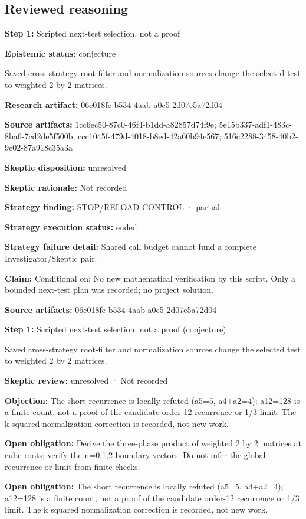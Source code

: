 \documentclass[11pt]{article}
\begin{document}
\subsection{Reviewed reasoning}
\textbf{Step 1:} Scripted next-test selection, not a proof\par
\textbf{Epistemic status:} conjecture\par
Saved cross-strategy root-filter and normalization sources change the selected test to weighted 2 by 2 matrices.\par
\textbf{Research artifact:} 06e018fe-b534-4aab-a0c5-2d07e5a72d04\par
\textbf{Source artifacts:} 1cc6ec50-87c0-46f4-b1dd-a82857d74f9e; 5e15b337-adf1-483c-8ba6-7cd2de5f500b; ccc1045f-479d-4018-b8ed-42a60b94e567; 516c2288-3458-40b2-9e02-87a918c35a3a\par
\textbf{Skeptic disposition:} unresolved\par
\textbf{Skeptic rationale:} Not recorded\par
\textbf{Strategy finding:} STOP/RELOAD CONTROL · partial\par
\textbf{Strategy execution status:} ended\par
\textbf{Strategy failure detail:} Shared call budget cannot fund a complete Investigator/Skeptic pair.\par
\textbf{Claim:} Conditional on: No new mathematical verification by this script. Only a bounded next-test plan was recorded; no project solution.\par
\textbf{Source artifacts:} 06e018fe-b534-4aab-a0c5-2d07e5a72d04\par
\textbf{Step 1:} Scripted next-test selection, not a proof (conjecture)\par
Saved cross-strategy root-filter and normalization sources change the selected test to weighted 2 by 2 matrices.\par
\textbf{Skeptic review:} unresolved · Not recorded\par
\textbf{Objection:} The short recurrence is locally refuted (a5=5, a4+a2=4); a12=128 is a finite count, not a proof of the candidate order-12 recurrence or 1/3 limit. The k squared normalization correction is recorded, not new work.\par
\textbf{Open obligation:} Derive the three-phase product of weighted 2 by 2 matrices at cube roots; verify the n=0,1,2 boundary vectors. Do not infer the global recurrence or limit from finite checks.\par
\textbf{Open obligation:} The short recurrence is locally refuted (a5=5, a4+a2=4); a12=128 is a finite count, not a proof of the candidate order-12 recurrence or 1/3 limit. The k squared normalization correction is recorded, not new work.\par
\end{document}
